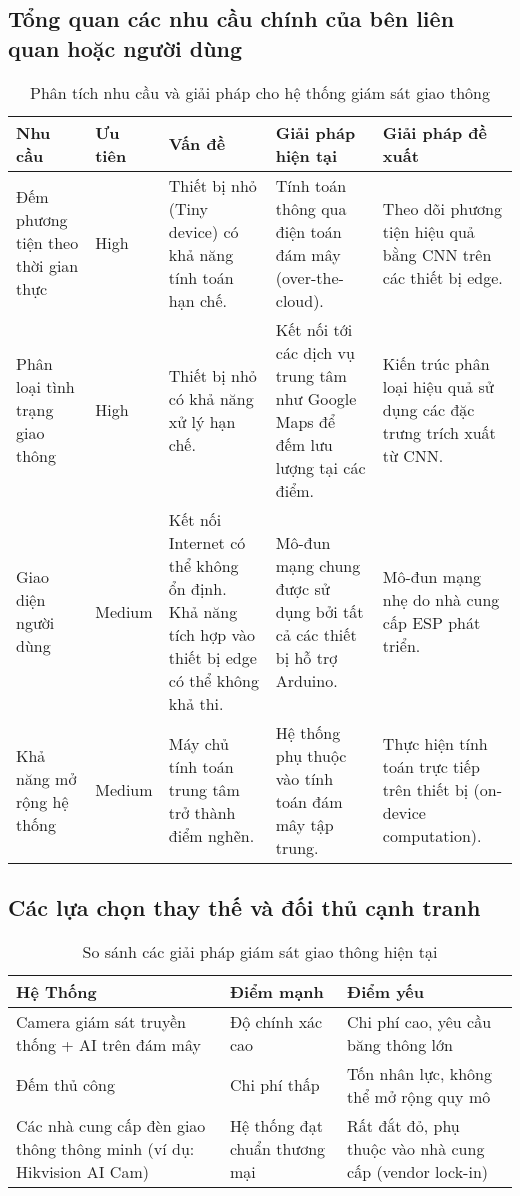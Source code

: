 \subsection{Tổng quan các nhu cầu chính của bên liên quan hoặc người dùng}
\begin{table}[H]
    \centering
    \begin{tabular}{|p{4cm}|p{2cm}|p{3.5cm}|p{3.5cm}|p{3.5cm}|}
    \hline
    \textbf{Nhu cầu} & \textbf{Ưu tiên} & \textbf{Vấn đề} & \textbf{Giải pháp hiện tại} & \textbf{Giải pháp đề xuất} \\
    \hline
    Đếm phương tiện theo thời gian thực & High & Thiết bị nhỏ (Tiny device) có khả năng tính toán hạn chế. & Tính toán thông qua điện toán đám mây (over-the-cloud). & Theo dõi phương tiện hiệu quả bằng CNN trên các thiết bị edge. \\
    \hline
    Phân loại tình trạng giao thông & High & Thiết bị nhỏ có khả năng xử lý hạn chế. & Kết nối tới các dịch vụ trung tâm như Google Maps để đếm lưu lượng tại các điểm. & Kiến trúc phân loại hiệu quả sử dụng các đặc trưng trích xuất từ CNN. \\
    \hline
    Giao diện người dùng & Medium & Kết nối Internet có thể không ổn định. Khả năng tích hợp vào thiết bị edge có thể không khả thi. & Mô-đun mạng chung được sử dụng bởi tất cả các thiết bị hỗ trợ Arduino. & Mô-đun mạng nhẹ do nhà cung cấp ESP phát triển. \\
    \hline
    Khả năng mở rộng hệ thống & Medium & Máy chủ tính toán trung tâm trở thành điểm nghẽn. & Hệ thống phụ thuộc vào tính toán đám mây tập trung. & Thực hiện tính toán trực tiếp trên thiết bị (on-device computation). \\
    \hline
    \end{tabular}
    \caption{Phân tích nhu cầu và giải pháp cho hệ thống giám sát giao thông}
\end{table}
\pagebreak
\subsection{Các lựa chọn thay thế và đối thủ cạnh tranh}

\begin{table}[H]
    \centering
    \begin{tabular}{|p{5cm}|p{4.5cm}|p{4.5cm}|}
    \hline
    \textbf{Hệ Thống} & \textbf{Điểm mạnh} & \textbf{Điểm yếu} \\
    \hline
    Camera giám sát truyền thống + AI trên đám mây & Độ chính xác cao & Chi phí cao, yêu cầu băng thông lớn \\
    \hline
    Đếm thủ công & Chi phí thấp & Tốn nhân lực, không thể mở rộng quy mô \\
    \hline
    Các nhà cung cấp đèn giao thông thông minh (ví dụ: Hikvision AI Cam) & Hệ thống đạt chuẩn thương mại & Rất đắt đỏ, phụ thuộc vào nhà cung cấp (vendor lock-in) \\
    \hline
    \end{tabular}
    \caption{So sánh các giải pháp giám sát giao thông hiện tại}
\end{table}

